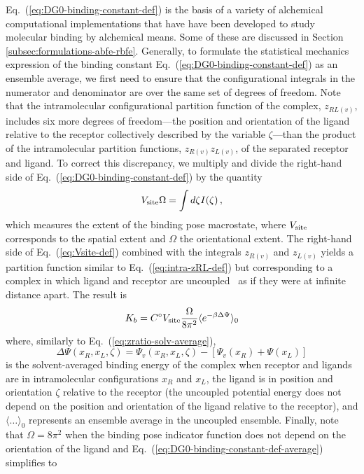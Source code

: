 \documentclass[9pt,bestpractices]{livecoms}
\begin{document}
Eq.~(\ref{eq:DG0-binding-constant-def}) is the basis of a variety of alchemical computational implementations that have have been developed to study molecular binding by alchemical means. Some of these are discussed in Section \ref{subsec:formulations-abfe-rbfe}. Generally, to formulate the statistical mechanics expression of the binding constant Eq.~(\ref{eq:DG0-binding-constant-def}) as an ensemble average, we first need to ensure that the configurational integrals in the numerator and denominator are over the same set of degrees of freedom. Note that the intramolecular configurational partition function of the complex, $z_{RL(v)}$, includes six more degrees of freedom---the position and orientation of the ligand relative to the receptor collectively described by the variable $\zeta$---than the product of the intramolecular partition functions, $z_{R(v)} z_{L(v)}$, of the separated receptor and ligand. To correct this discrepancy, we multiply and divide the right-hand side of Eq.~(\ref{eq:DG0-binding-constant-def})  by the quantity
\begin{equation} \label{eq:Vsite-def}
    V_{\rm site} \Omega = \int d\zeta I(\zeta) \, ,
\end{equation}
which measures the extent of the binding pose macrostate, where $V_{\rm site}$ corresponds to the spatial extent and $\Omega$ the orientational extent. The right-hand side of Eq.~(\ref{eq:Vsite-def}) combined with the integrals $z_{R(v)}$ and $z_{L(v)}$ yields a partition function similar to Eq.~(\ref{eq:intra-zRL-def}) but corresponding to a complex in which ligand and receptor are uncoupled~\cite{gallicchio2011recent} as if they were at infinite distance apart. The result is
\begin{equation}\label{eq:DG0-binding-constant-def-average}
  K_b = C^\circ V_{\rm site} \frac{\Omega}{8 \pi^2} \langle e^{-\beta \Delta \Psi}  \rangle_0
\end{equation}
where, similarly to Eq.~(\ref{eq:zratio-solv-average}),
\begin{equation}\label{eq:pert-energy-def}
  \Delta \Psi(x_R, x_L, \zeta) =  \Psi_v(x_R, x_L, \zeta) - \left[  \Psi_v(x_R) + \Psi(x_L) \right]
\end{equation}
is the solvent-averaged binding energy of the complex when receptor and ligands are in intramolecular configurations $x_R$ and $x_L$, the ligand is in position and orientation $\zeta$ relative to the receptor (the uncoupled potential energy does not depend on  the position and orientation of the ligand relative to the receptor), and $\langle \ldots \rangle_0$ represents an ensemble average in the uncoupled ensemble. Finally, note that $\Omega = 8 \pi^2$ when the binding pose indicator function does not depend on the orientation of the ligand and Eq.~(\ref{eq:DG0-binding-constant-def-average}) simplifies to
\end{document}
